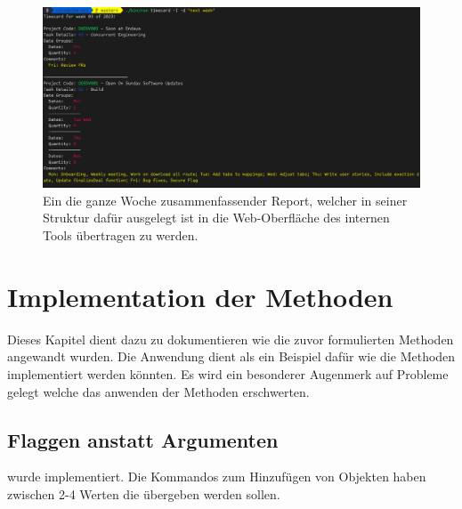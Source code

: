 \documentclass[oneside,bibliography=totocnumbered,BCOR=5mm]{scrbook}
\begin{document}
\begin{figure}[H]
  \centering
  \includegraphics[scale=0.5]{timecard-real.png}
  \caption{Ein die ganze Woche zusammenfassender Report, welcher in seiner Struktur dafür ausgelegt ist in die Web-Oberfläche des internen Tools übertragen zu werden.}
  \label{fig:timecard}
\end{figure}

\chapter{Implementation der Methoden}
\label{sec:implementation}

Dieses Kapitel dient dazu zu dokumentieren wie die zuvor formulierten Methoden
angewandt wurden. Die Anwendung dient als ein Beispiel dafür wie die Methoden
implementiert werden könnten. Es wird ein besonderer Augenmerk auf Probleme
gelegt welche das anwenden der Methoden erschwerten.

\section{Flaggen anstatt Argumenten}

 wurde implementiert. Die Kommandos zum Hinzufügen
von Objekten haben zwischen 2-4 Werten die übergeben werden sollen.
\end{document}
